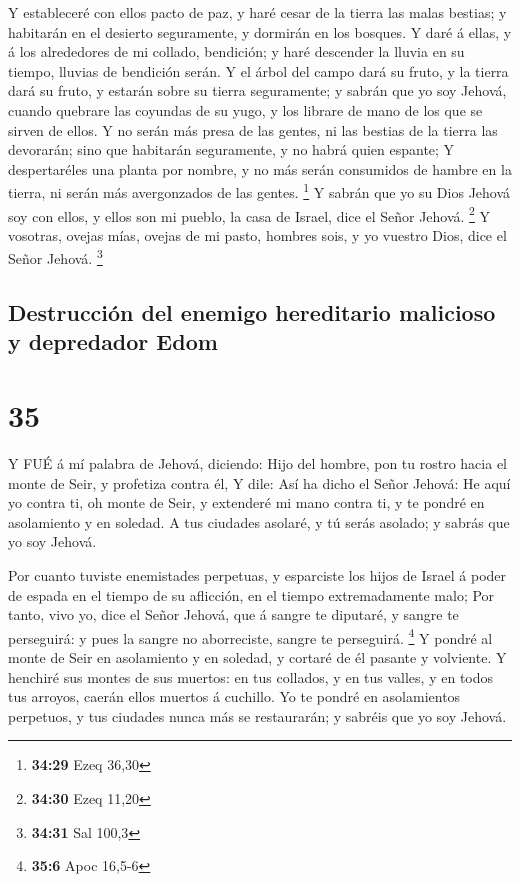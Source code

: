  Y estableceré con ellos pacto de paz, y haré cesar de la
tierra las malas bestias; y habitarán en el desierto seguramente, y
dormirán en los bosques.  Y daré á ellas, y á los
alrededores de mi collado, bendición; y haré descender la lluvia en su
tiempo, lluvias de bendición serán.  Y el árbol del campo
dará su fruto, y la tierra dará su fruto, y estarán sobre su tierra
seguramente; y sabrán que yo soy Jehová, cuando quebrare las coyundas de
su yugo, y los librare de mano de los que se sirven de ellos.
 Y no serán más presa de las gentes, ni las bestias de la
tierra las devorarán; sino que habitarán seguramente, y no habrá quien
espante;  Y despertaréles una planta por nombre, y no más
serán consumidos de hambre en la tierra, ni serán más avergonzados de
las gentes. \footnote{\textbf{34:29} Ezeq 36,30}  Y sabrán
que yo su Dios Jehová soy con ellos, y ellos son mi pueblo, la casa de
Israel, dice el Señor Jehová. \footnote{\textbf{34:30} Ezeq 11,20}
 Y vosotras, ovejas mías, ovejas de mi pasto, hombres sois,
y yo vuestro Dios, dice el Señor Jehová. \footnote{\textbf{34:31} Sal
  100,3}

\hypertarget{destrucciuxf3n-del-enemigo-hereditario-malicioso-y-depredador-edom}{%
\subsection{Destrucción del enemigo hereditario malicioso y depredador
Edom}\label{destrucciuxf3n-del-enemigo-hereditario-malicioso-y-depredador-edom}}

\hypertarget{section-34}{%
\section{35}\label{section-34}}

 Y FUÉ á mí palabra de Jehová, diciendo:  Hijo
del hombre, pon tu rostro hacia el monte de Seir, y profetiza contra él,
 Y dile: Así ha dicho el Señor Jehová: He aquí yo contra ti,
oh monte de Seir, y extenderé mi mano contra ti, y te pondré en
asolamiento y en soledad.  A tus ciudades asolaré, y tú
serás asolado; y sabrás que yo soy Jehová.

 Por cuanto tuviste enemistades perpetuas, y esparciste los
hijos de Israel á poder de espada en el tiempo de su aflicción, en el
tiempo extremadamente malo;  Por tanto, vivo yo, dice el
Señor Jehová, que á sangre te diputaré, y sangre te perseguirá: y pues
la sangre no aborreciste, sangre te perseguirá. \footnote{\textbf{35:6}
  Apoc 16,5-6}  Y pondré al monte de Seir en asolamiento y
en soledad, y cortaré de él pasante y volviente.  Y henchiré
sus montes de sus muertos: en tus collados, y en tus valles, y en todos
tus arroyos, caerán ellos muertos á cuchillo.  Yo te pondré
en asolamientos perpetuos, y tus ciudades nunca más se restaurarán; y
sabréis que yo soy Jehová.

